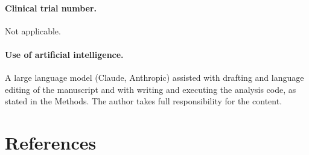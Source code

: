 \documentclass[12pt]{article}
\begin{document}
\paragraph{Clinical trial number.} Not applicable.

\paragraph{Use of artificial intelligence.} A large language model (Claude, Anthropic) assisted with drafting and language editing of the manuscript and with writing and executing the analysis code, as stated in the Methods. The author takes full responsibility for the content.

\clearpage
\section*{References}
\end{document}
